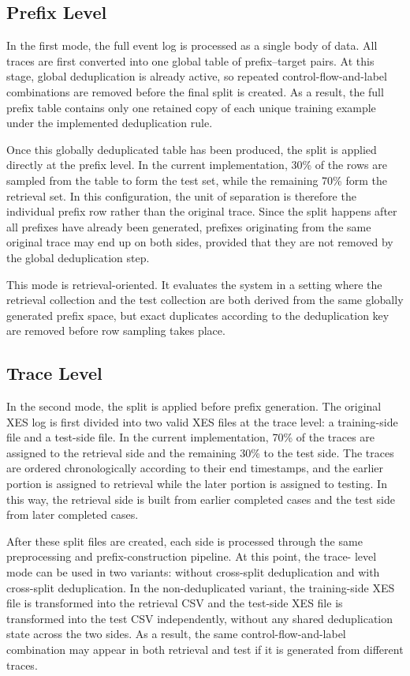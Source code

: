 \subsection{Prefix Level}
In the first mode, the full event log is processed as a single body of data.
All traces are first converted into one global table of prefix--target pairs.
At this stage, global deduplication is already active, so repeated
control-flow-and-label combinations are removed before the final split is
created. As a result, the full prefix table contains only one retained copy of
each unique training example under the implemented deduplication rule.

\indent Once this globally deduplicated table has been produced, the split is
applied directly at the prefix level. In the current implementation, 30\% of
the rows are sampled from the table to form the test set, while the remaining
70\% form the retrieval set. In this configuration, the unit of separation is
therefore the individual prefix row rather than the original trace. Since the
split happens after all prefixes have already been generated, prefixes
originating from the same original trace may end up on both sides, provided
that they are not removed by the global deduplication step.

\indent This mode is retrieval-oriented. It evaluates the system in a setting
where the retrieval collection and the test collection are both derived from
the same globally generated prefix space, but exact duplicates according to
the deduplication key are removed before row sampling takes place.

\subsection{Trace Level}
In the second mode, the split is applied before prefix generation. The
original XES log is first divided into two valid XES files at the trace level:
a training-side file and a test-side file. In the current implementation,
70\% of the traces are assigned to the retrieval side and the remaining 30\%
to the test side. The traces are ordered chronologically according to their
end timestamps, and the earlier portion is assigned to retrieval while the
later portion is assigned to testing. In this way, the retrieval side is
built from earlier completed cases and the test side from later completed
cases.

\indent After these split files are created, each side is processed through the
same preprocessing and prefix-construction pipeline. At this point, the trace-
level mode can be used in two variants: without cross-split deduplication and
with cross-split deduplication. In the non-deduplicated variant, the
training-side XES file is transformed into the retrieval CSV and the test-side
XES file is transformed into the test CSV independently, without any shared
deduplication state across the two sides. As a result, the same
control-flow-and-label combination may appear in both retrieval and test if it
is generated from different traces.

